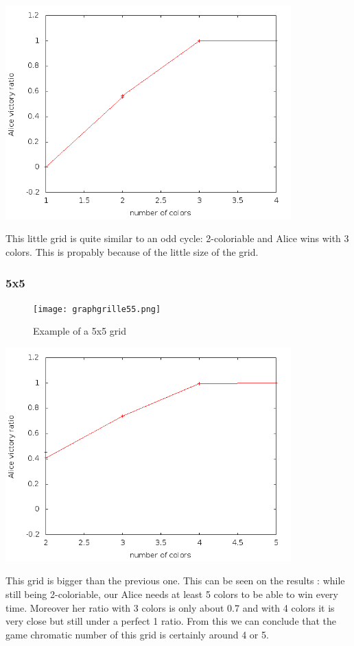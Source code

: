\includegraphics[width=11cm]{resultats/grille25.png}

This little grid is quite similar to an odd cycle: 2-coloriable and Alice wins with 3 colors. This is propably because of the little size of the grid.

\subsubsection{5x5}

\begin{figure}[h]
\begin{center}  
	\texttt{[image: graphgrille55.png]}
\end{center}
    \caption{Example of a 5x5 grid}
    \label{grid55}
\end{figure}

\includegraphics[width=11cm]{resultats/grille55.png}

This grid is bigger than the previous one. This can be seen on the results : while still being 2-coloriable, our Alice needs at least 5 colors to be able to win every time. Moreover her ratio with 3 colors is only about 0.7 and with 4 colors it is very close but still under a perfect 1 ratio. From this we can conclude that the game chromatic number of this grid is certainly around 4 or 5.

